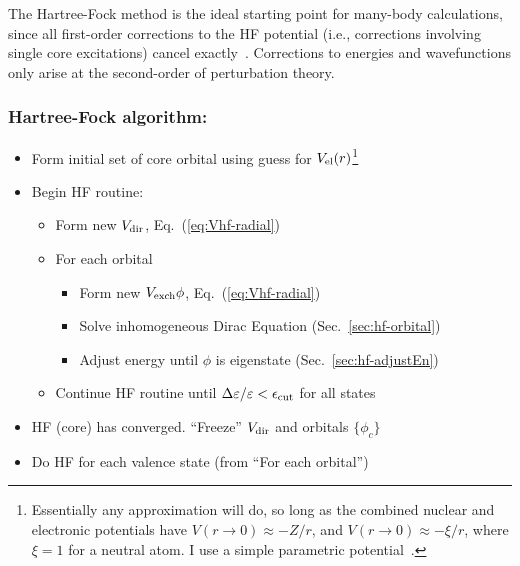 \documentclass[10pt,twocolumn,a4paper]{article}%
\def\en{\ensuremath{\varepsilon}}
\begin{document}
The Hartree-Fock method is the ideal starting point for many-body calculations, since all first-order corrections to the HF potential (i.e., corrections involving single core excitations) cancel exactly~\cite{Lindgren1986}.
Corrections to energies and wavefunctions only arise at the second-order of perturbation theory.



\subsubsection*{Hartree-Fock algorithm:}
\begin{itemize}[topsep=3px]
\setlength{\parskip}{1pt} \setlength{\itemsep}{0pt plus 1pt}
\item Form initial set of core orbital using guess for $V_{\rm el}(r)$\footnote{Essentially any approximation will do, so long as the combined nuclear and electronic potentials have $V(r\to0)\approx - Z/r$, and  $V(r\to0)\approx - \xi/r$, where $\xi=1$ for a neutral atom. I use a simple parametric potential~\cite{Green1969}.}
\item Begin HF routine:
	\begin{itemize}\setlength{\parskip}{1pt} \setlength{\itemsep}{0pt plus 1pt}
	\item Form new $V_{\rm dir}$, Eq.~(\ref{eq:Vhf-radial})
	\item For each orbital
	\begin{itemize}
	\item Form new $V_{\rm exch}\phi$, Eq.~(\ref{eq:Vhf-radial})
	\item Solve inhomogeneous Dirac Equation (Sec.~\ref{sec:hf-orbital})
	\item Adjust energy until $\phi$ is eigenstate (Sec.~\ref{sec:hf-adjustEn})
	\end{itemize}
	\item Continue HF routine until $\Delta\en/\en<\epsilon_{\rm cut}$ for all states
	\end{itemize}
	\item HF (core) has converged. ``Freeze'' $V_{\rm dir}$ and orbitals $\{\phi_c\}$
	\item Do HF for each valence state (from ``For each orbital'')\\
\end{itemize}
\end{document}
